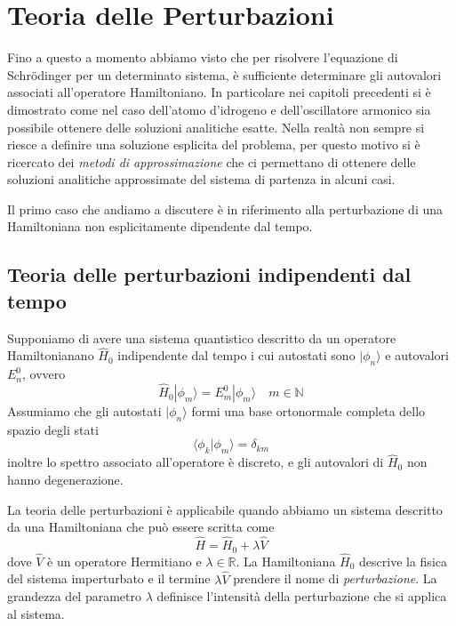 \setcounter{chapter}{4}
\chapter{Teoria delle Perturbazioni}

Fino a questo a momento abbiamo visto che per risolvere l'equazione di Schr\"odinger per un determinato sistema, \`e sufficiente determinare gli autovalori associati all'operatore Hamiltoniano. In particolare nei capitoli precedenti si \`e dimostrato come nel caso dell'atomo d'idrogeno e dell'oscillatore armonico sia possibile ottenere delle soluzioni analitiche esatte. Nella realt\`a non sempre si riesce a definire una soluzione esplicita del problema, per questo motivo si \`e ricercato dei \textit{metodi di approssimazione} che ci permettano di ottenere delle soluzioni analitiche approssimate del sistema di partenza in alcuni casi.

Il primo caso che andiamo a discutere \`e in riferimento alla perturbazione di una Hamiltoniana non esplicitamente dipendente dal tempo.


\section{Teoria delle perturbazioni indipendenti dal tempo}

Supponiamo  di avere una sistema quantistico descritto da un operatore Hamiltonianano $\hat{H}_0$ indipendente dal tempo i cui autostati sono $|\phi_n \rangle $ e autovalori $E_{n}^0$, ovvero
\begin{equation*}
	\hat{H}_0 |\phi_m \rangle = E_m^0 | \phi_{m} \rangle \quad m \in \mathbb{N}
\end{equation*} 
Assumiamo che gli autostati $\vert \phi_n \rangle$ formi una base ortonormale completa dello spazio degli stati
\begin{equation*}
	\langle \phi_{k} | \phi_m \rangle = \delta_{km}
\end{equation*}
inoltre lo spettro associato all'operatore \`e discreto, e gli autovalori di $\hat{H}_0$ non hanno degenerazione.

La teoria delle perturbazioni \`e applicabile quando abbiamo un sistema descritto da una Hamiltoniana che pu\`o essere scritta come
\begin{equation}
	\hat{H} =  \hat{H}_0 + \lambda \hat{V}
\end{equation}
dove $\hat{V}$ \`e un operatore Hermitiano e $\lambda \in \mathbb{R}$. La Hamiltoniana $\hat{H}_0$ descrive la fisica del sistema imperturbato e il termine $\lambda \hat{V}$ prendere il nome di \textit{perturbazione}. La grandezza del parametro $\lambda$  definisce l'intensit\`a della perturbazione che si applica al sistema.

